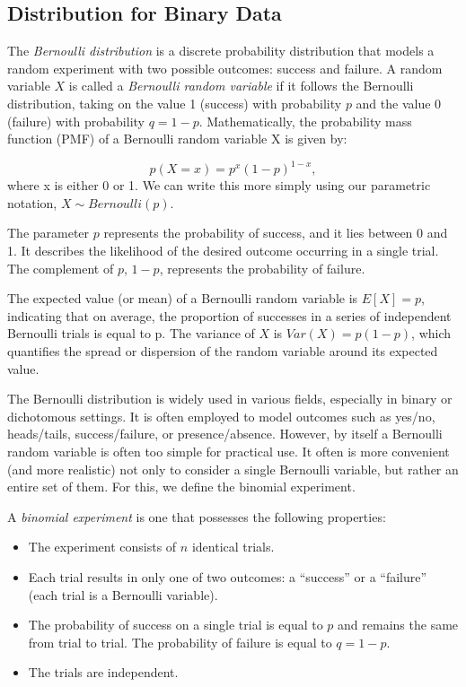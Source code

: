 \documentclass{article}
\begin{document}
\subsection{Distribution for Binary Data}

The \emph{Bernoulli distribution} is a discrete probability distribution that models a random experiment with two possible outcomes: success and failure. A random variable $X$ is called a \emph{Bernoulli random variable} if it follows the Bernoulli distribution, taking on the value 1 (success) with probability $p$ and the value 0 (failure) with probability $q = 1 - p$. Mathematically, the probability mass function (PMF) of a Bernoulli random variable X is given by:

$$
p(X = x) = p^x (1 - p)^{1 - x},
$$
where x is either 0 or 1. We can write this more simply using our parametric notation, $X \sim Bernoulli(p)$.

The parameter $p$ represents the probability of success, and it lies between 0 and 1. It describes the likelihood of the desired outcome occurring in a single trial. The complement of $p$, $1 - p$, represents the probability of failure.

The expected value (or mean) of a Bernoulli random variable is $E[X] = p$, indicating that on average, the proportion of successes in a series of independent Bernoulli trials is equal to p. The variance of $X$ is $Var(X) = p(1 - p)$, which quantifies the spread or dispersion of the random variable around its expected value.

The Bernoulli distribution is widely used in various fields, especially in binary or dichotomous settings. It is often employed to model outcomes such as yes/no, heads/tails, success/failure, or presence/absence. However, by itself a Bernoulli random variable is often too simple for practical use. It often is more convenient (and more realistic) not only to consider a single Bernoulli variable, but rather an entire set of them. For this, we define the binomial experiment.

A \emph{binomial experiment} is one that possesses the following properties:

\begin{itemize}
    \item The experiment consists of $n$ identical trials.
    \item Each trial results in only one of two outcomes: a “success” or a “failure” (each trial is a Bernoulli variable).
    \item The probability of success on a single trial is equal to $p$ and remains the same from trial to trial. The probability of failure is equal to $q = 1 - p$.
    \item The trials are independent.
\end{itemize}
\end{document}
